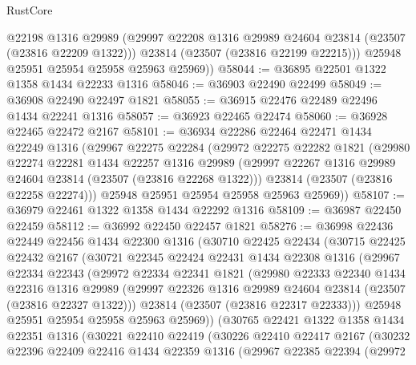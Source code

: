 \begin{lexlean}{RustCore}
\begin{coremodule}
          @22198
          @1316
          @29989
          (@29997 @22208 @1316 @29989 @24604 @23814 (@23507 (@23816 @22209 @1322)))
          @23814
          (@23507 (@23816 @22199 @22215)))
        @25948
        @25951
        @25954
        @25958
        @25963
        @25969))
@58044 := @36895 @22501 @1322 @1358 @1434 @22233 @1316
@58046 := @36903 @22490 @22499
@58049 := @36908 @22490 @22497 @1821
@58055 := @36915 @22476 @22489 @22496 @1434 @22241 @1316
@58057 := @36923 @22465 @22474
@58060 := @36928 @22465 @22472 @2167
@58101 := @36934
    @22286
    @22464
    @22471
    @1434
    @22249
    @1316
    (@29967
      @22275
      @22284
      (@29972
        @22275
        @22282
        @1821
        (@29980
          @22274
          @22281
          @1434
          @22257
          @1316
          @29989
          (@29997 @22267 @1316 @29989 @24604 @23814 (@23507 (@23816 @22268 @1322)))
          @23814
          (@23507 (@23816 @22258 @22274)))
        @25948
        @25951
        @25954
        @25958
        @25963
        @25969))
@58107 := @36979 @22461 @1322 @1358 @1434 @22292 @1316
@58109 := @36987 @22450 @22459
@58112 := @36992 @22450 @22457 @1821
@58276 := @36998
    @22436
    @22449
    @22456
    @1434
    @22300
    @1316
    (@30710
      @22425
      @22434
      (@30715
        @22425
        @22432
        @2167
        (@30721
          @22345
          @22424
          @22431
          @1434
          @22308
          @1316
          (@29967
            @22334
            @22343
            (@29972
              @22334
              @22341
              @1821
              (@29980
                @22333
                @22340
                @1434
                @22316
                @1316
                @29989
                (@29997 @22326 @1316 @29989 @24604 @23814 (@23507 (@23816 @22327 @1322)))
                @23814
                (@23507 (@23816 @22317 @22333)))
              @25948
              @25951
              @25954
              @25958
              @25963
              @25969))
          (@30765
            @22421
            @1322
            @1358
            @1434
            @22351
            @1316
            (@30221
              @22410
              @22419
              (@30226
                @22410
                @22417
                @2167
                (@30232
                  @22396
                  @22409
                  @22416
                  @1434
                  @22359
                  @1316
                  (@29967
                    @22385
                    @22394
                    (@29972

\end{coremodule}
\end{lexlean}
